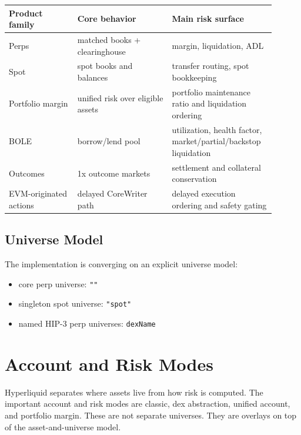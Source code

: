 \documentclass[11pt]{article}
\begin{document}
\begin{center}
\begin{tabular}{>{\raggedright\arraybackslash}p{0.24\linewidth} >{\raggedright\arraybackslash}p{0.33\linewidth} >{\raggedright\arraybackslash}p{0.33\linewidth}}
\toprule
\textbf{Product family} & \textbf{Core behavior} & \textbf{Main risk surface} \\
\midrule
Perps & matched books + clearinghouse & margin, liquidation, ADL \\
Spot & spot books and balances & transfer routing, spot bookkeeping \\
Portfolio margin & unified risk over eligible assets & portfolio maintenance ratio and liquidation ordering \\
BOLE & borrow/lend pool & utilization, health factor, market/partial/backstop liquidation \\
Outcomes & 1x outcome markets & settlement and collateral conservation \\
EVM-originated actions & delayed CoreWriter path & delayed execution ordering and safety gating \\
\bottomrule
\end{tabular}
\end{center}

\subsection{Universe Model}

The implementation is converging on an explicit universe model:

\begin{itemize}[leftmargin=1.4em]
  \item core perp universe: \texttt{""}
  \item singleton spot universe: \texttt{"spot"}
  \item named HIP-3 perp universes: \texttt{dexName}
\end{itemize}

\section{Account and Risk Modes}

Hyperliquid separates where assets live from how risk is computed. The
important account and risk modes are classic, dex abstraction, unified account,
and portfolio margin. These are not separate universes. They are overlays on
top of the asset-and-universe model.
\end{document}
